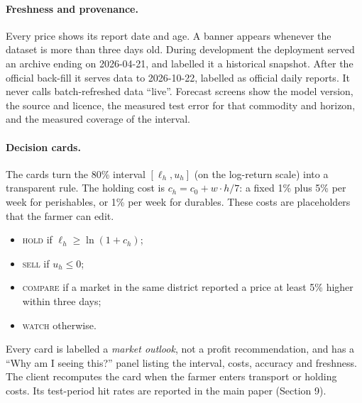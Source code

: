 \documentclass[10pt]{article}
\begin{document}
\paragraph{Freshness and provenance.}
Every price shows its report date and age.
A banner appears whenever the dataset is more than three days old.
During development the deployment served an archive ending on 2026-04-21, and labelled it a historical snapshot. After the official back-fill it serves data to 2026-10-22, labelled as official daily reports. It never calls batch-refreshed data ``live''.
Forecast screens show the model version, the source and licence, the measured test error for that commodity and horizon, and the measured coverage of the interval.

\paragraph{Decision cards.}
The cards turn the 80\% interval $[\ell_h,u_h]$ (on the log-return scale) into a transparent rule.
The holding cost is $c_h = c_0 + w\cdot h/7$: a fixed 1\% plus 5\% per week for perishables, or 1\% per week for durables.
These costs are placeholders that the farmer can edit.
\begin{itemize}
  \item \textsc{hold} if $\ell_h\ge\ln(1+c_h)$;
  \item \textsc{sell} if $u_h\le 0$;
  \item \textsc{compare} if a market in the same district reported a price at least 5\% higher within three days;
  \item \textsc{watch} otherwise.
\end{itemize}
Every card is labelled a \emph{market outlook}, not a profit recommendation, and has a ``Why am I seeing this?'' panel listing the interval, costs, accuracy and freshness.
The client recomputes the card when the farmer enters transport or holding costs.
Its test-period hit rates are reported in the main paper (Section 9).
\end{document}
